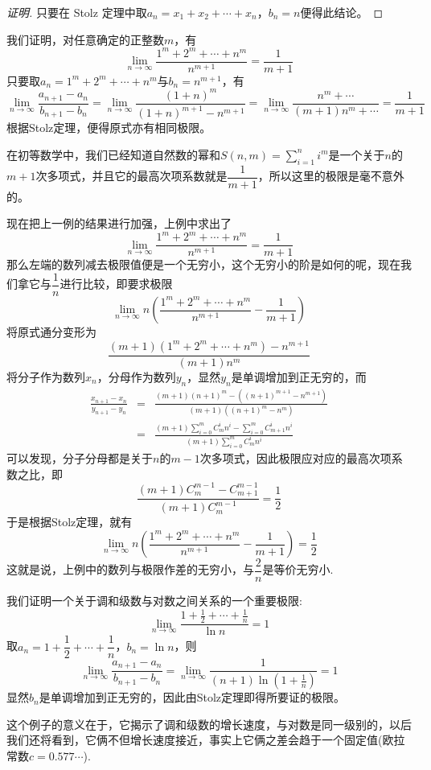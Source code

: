 \begin{proof}[证明]
  只要在 Stolz 定理中取$a_n=x_1+x_2+\cdots+x_n$，$b_n=n$便得此结论。
\end{proof}

\begin{example}
  我们证明，对任意确定的正整数$m$，有
  \[ \lim_{n \to \infty} \frac{1^m+2^m+\cdots+n^m}{n^{m+1}} = \frac{1}{m+1} \]
  只要取$a_n=1^m+2^m+\cdots+n^m$与$b_n=n^{m+1}$，有
  \[ \lim_{n \to \infty} \frac{a_{n+1}-a_n}{b_{n+1}-b_n} = \lim_{n \to \infty} \frac{(1+n)^m}{(1+n)^{m+1}-n^{m+1}} = \lim_{n \to \infty} \frac{n^m+\cdots}{(m+1)n^m+\cdots} = \frac{1}{m+1} \]
  根据Stolz定理，便得原式亦有相同极限。

  在初等数学中，我们已经知道自然数的幂和$S(n,m)=\sum\limits_{i=1}^ni^m$是一个关于$n$的$m+1$次多项式，并且它的最高次项系数就是$\dfrac{1}{m+1}$，所以这里的极限是毫不意外的。
\end{example}

\begin{example}
  现在把上一例的结果进行加强，上例中求出了
  \[ \lim_{n \to \infty} \frac{1^m+2^m+\cdots+n^m}{n^{m+1}} = \frac{1}{m+1} \]
  那么左端的数列减去极限值便是一个无穷小，这个无穷小的阶是如何的呢，现在我们拿它与$\dfrac{1}{n}$进行比较，即要求极限
  \[ \lim_{n \to \infty} n \left( \frac{1^m+2^m+\cdots+n^m}{n^{m+1}} - \frac{1}{m+1} \right) \]
  将原式通分变形为
  \[ \frac{(m+1)(1^m+2^m+\cdots+n^m)-n^{m+1}}{(m+1)n^m} \]
  将分子作为数列$x_n$，分母作为数列$y_n$，显然$y_n$是单调增加到正无穷的，而
  \begin{eqnarray*}
    \frac{x_{n+1}-x_n}{y_{n+1}-y_n} & = & \frac{(m+1)(n+1)^m-((n+1)^{m+1}-n^{m+1})}{(m+1)((n+1)^m-n^m)} \\
    & = & \frac{(m+1)\sum_{i=0}^mC_m^in^i-\sum_{i=0}^mC_{m+1}^in^i}{(m+1)\sum_{i=0}^mC_m^in^i}
  \end{eqnarray*}
  可以发现，分子分母都是关于$n$的$m-1$次多项式，因此极限应对应的最高次项系数之比，即
  \[ \frac{(m+1)C_m^{m-1}-C_{m+1}^{m-1}}{(m+1)C_m^{m-1}} = \frac{1}{2} \]
  于是根据Stolz定理，就有
  \[ \lim_{n \to \infty} n \left( \frac{1^m+2^m+\cdots+n^m}{n^{m+1}} - \frac{1}{m+1} \right) = \frac{1}{2} \]
  这就是说，上例中的数列与极限作差的无穷小，与$\dfrac{2}{n}$是等价无穷小.
\end{example}

\begin{example}
  我们证明一个关于调和级数与对数之间关系的一个重要极限:
  \[ \lim_{n \to \infty} \frac{1+\frac{1}{2}+\cdots+\frac{1}{n}}{\ln{n}} = 1 \]
  取$a_n=1+\dfrac{1}{2}+\cdots+\dfrac{1}{n}$，$b_n=\ln{n}$，则
  \[ \lim_{n \to \infty} \frac{a_{n+1}-a_n}{b_{n+1}-b_n} = \lim_{n \to \infty} \frac{1}{(n+1)\ln{\left( 1+ \frac{1}{n} \right)}} = 1 \]
  显然$b_n$是单调增加到正无穷的，因此由Stolz定理即得所要证的极限。

  这个例子的意义在于，它揭示了调和级数的增长速度，与对数是同一级别的，以后我们还将看到，它俩不但增长速度接近，事实上它俩之差会趋于一个固定值(欧拉常数$c=0.577\cdots$).
\end{example}



